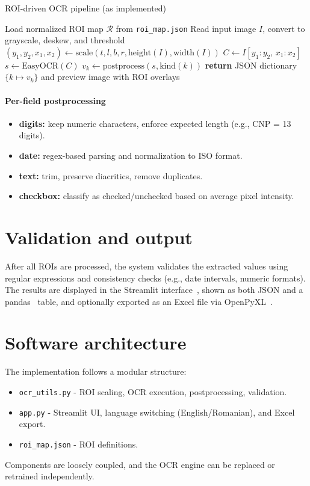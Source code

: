 \documentclass[runningheads,a4paper,11pt]{report}
\begin{document}
\begin{algorithm}[H]
\caption{ROI-driven OCR pipeline (as implemented)}
\begin{algorithmic}
  \STATE Load normalized ROI map $\mathcal{R}$ from \texttt{roi\_map.json}
  \STATE Read input image $I$, convert to grayscale, deskew, and threshold
     \STATE $(y_1,y_2,x_1,x_2)\leftarrow \text{scale}(t,l,b,r,\text{height}(I),\text{width}(I))$
     \STATE $C \leftarrow I[y_1\!:\!y_2,\,x_1\!:\!x_2]$
     \STATE $s \leftarrow \text{EasyOCR}(C)$
     \STATE $v_k \leftarrow \text{postprocess}(s, \text{kind}(k))$
  \ENDFOR
  \STATE \textbf{return} JSON dictionary $\{k \mapsto v_k\}$ and preview image with ROI overlays
\end{algorithmic}
\end{algorithm}

\paragraph{Per-field postprocessing}
\begin{itemize}
  \item \textbf{digits:} keep numeric characters, enforce expected length (e.g., CNP = 13 digits).
  \item \textbf{date:} regex-based parsing and normalization to ISO format.
  \item \textbf{text:} trim, preserve diacritics, remove duplicates.
  \item \textbf{checkbox:} classify as checked/unchecked based on average pixel intensity.
\end{itemize}

\section{Validation and output}
After all ROIs are processed, the system validates the extracted values using regular expressions and consistency checks (e.g., date intervals, numeric formats).  
The results are displayed in the Streamlit interface~\cite{Streamlit2023}, shown as both JSON and a pandas~\cite{McKinney2010} table, and optionally exported as an Excel file via OpenPyXL~\cite{OpenPyXL2024}.

\section{Software architecture}
The implementation follows a modular structure:
\begin{itemize}
  \item \texttt{ocr\_utils.py} - ROI scaling, OCR execution, postprocessing, validation.
  \item \texttt{app.py} - Streamlit UI, language switching (English/Romanian), and Excel export.
  \item \texttt{roi\_map.json} - ROI definitions.
\end{itemize}
Components are loosely coupled, and the OCR engine can be replaced or retrained independently.
\end{document}

